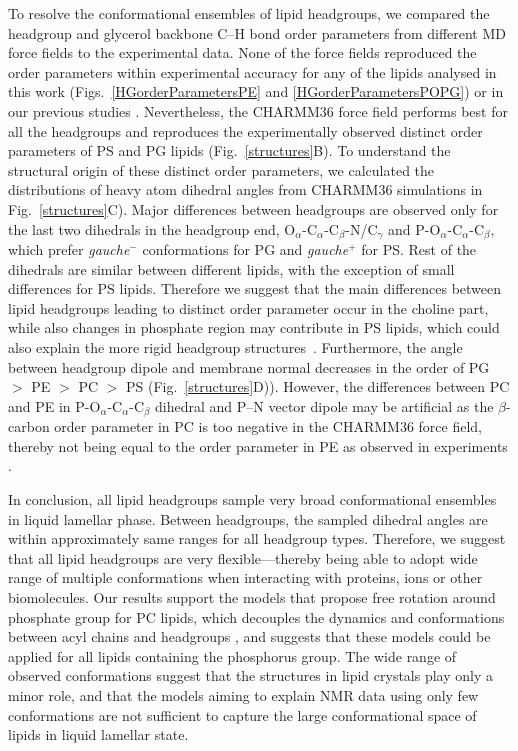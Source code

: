 \documentclass[aps,prl,superscriptaddress,twocolumn]{revtex4}
\begin{document}
To resolve the conformational ensembles of lipid headgroups, we compared the headgroup and glycerol backbone C--H bond order parameters from different MD force fields to the experimental data. None of the force fields reproduced the order parameters within experimental accuracy for any of the lipids analysed in this work (Figs.~\ref{HGorderParametersPE} and \ref{HGorderParametersPOPG}) or in our previous studies \cite{botan15,antila19}. Nevertheless, the CHARMM36 force field performs best for all the headgroups and reproduces the experimentally observed distinct order parameters of PS and PG lipids (Fig.~\ref{structures}B). To understand the structural origin of these distinct order parameters, we calculated the distributions of heavy atom dihedral angles from CHARMM36 simulations in Fig.~\ref{structures}C). Major differences between headgroups are observed only for the last two dihedrals in the headgroup end,  O$_\alpha$-C$_\alpha$-C$_\beta$-N/C$_\gamma$ and P-O$_\alpha$-C$_\alpha$-C$_\beta$, which prefer \textit{gauche$^-$} conformations for PG and \textit{gauche$^+$} for PS. Rest of the dihedrals are similar between different lipids, with the exception of small differences for PS lipids. Therefore we suggest that the main differences between lipid headgroups leading to distinct order parameter occur in the choline part, while also changes in phosphate region may contribute in PS lipids, which could also explain the more rigid headgroup structures~\cite{browning80,buldt81}.
Furthermore, the angle between headgroup dipole and membrane normal decreases in the order of PG $>$ PE  $>$ PC  $>$ PS (Fig.~\ref{structures}D)). However, the differences between PC and PE in P-O$_\alpha$-C$_\alpha$-C$_\beta$ dihedral
and P--N vector dipole may be artificial as the $\beta$-carbon order parameter in PC is too negative in the CHARMM36 force field, thereby not being equal to the order parameter in PE as observed in experiments \cite{botan15}.

In conclusion, all lipid headgroups sample very broad conformational ensembles in liquid lamellar phase.
Between headgroups, the sampled dihedral angles are within approximately same ranges for all headgroup types. Therefore, we suggest that all lipid headgroups are very flexible---thereby being
able to adopt wide range of multiple conformations when interacting with proteins, ions or other biomolecules. Our results support the models that propose free rotation around phosphate group for PC lipids, which decouples the dynamics and conformations between acyl chains and headgroups \cite{klauda08c,antila21b}, and suggests that these models could be applied for all lipids containing the phosphorus group. The wide range of observed conformations suggest that the structures in lipid crystals \cite{buldt81,pascher92} play only a minor role, and that the models aiming to explain NMR data using only few conformations \cite{seelig77c,davis83,Semchyschyn04,akutsu20} are not sufficient to capture the large conformational space of lipids in liquid lamellar state.
\end{document}
